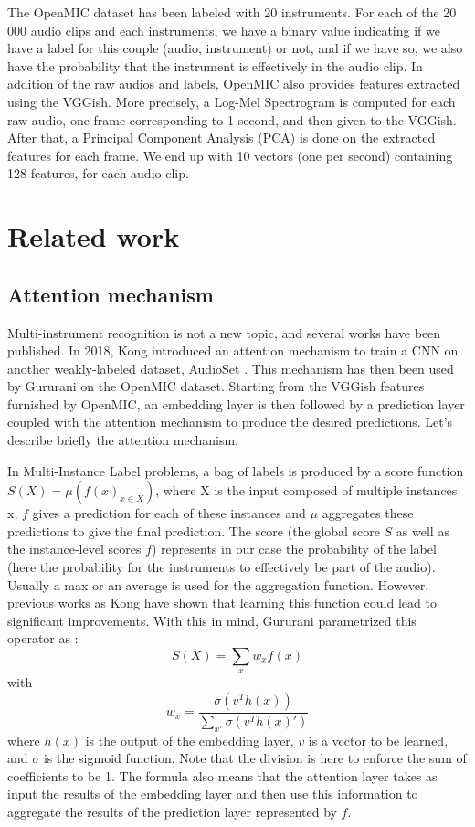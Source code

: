 \documentclass[final]{cvpr}
\begin{document}
The OpenMIC dataset has been labeled with 20 instruments. For each of the 20 000 audio clips and each instruments, we have a binary value indicating if we have a label for this couple (audio, instrument) or not, and if we have so, we also have the probability that the instrument is effectively in the audio clip. In addition of the raw audios and labels, OpenMIC also provides features extracted using the VGGish. More precisely, a Log-Mel Spectrogram is computed for each raw audio, one frame corresponding to 1 second, and then given to the VGGish. After that, a Principal Component Analysis (PCA) is done on the extracted features for each frame. We end up with 10 vectors (one per second) containing 128 features, for each audio clip.
\section{Related work}
\subsection{Attention mechanism}
Multi-instrument recognition is not a new topic, and several works have been published. In 2018, Kong \etal \cite{kong} introduced an attention mechanism to train a CNN on another weakly-labeled dataset, AudioSet \cite{audioset}. This mechanism has then been used by Gururani \etal \cite{attention} on the OpenMIC dataset. Starting from the VGGish features furnished by OpenMIC, an embedding layer is then followed by a prediction layer coupled with the attention mechanism to produce the desired predictions. Let's describe briefly the attention mechanism. 

In Multi-Instance Label problems, a bag of labels is produced by a score function $S(X)=\mu(f(x)_{x\in X})$, where X is the input composed of multiple instances x, $f$ gives a prediction for each of these instances and $\mu$ aggregates these predictions to give the final prediction. The score (the global score $S$ as well as the instance-level scores $f$) represents in our case the probability of the label (here the probability for the instruments to effectively be part of the audio). Usually a max or an average is used for the aggregation function. However, previous works as Kong \etal \cite{kong} have shown that learning this function could lead to significant improvements. With this in mind, Gururani \etal parametrized this operator as :
\[S(X)=\sum_{x}w_xf(x)\]
with 
\[w_x =\frac{\sigma(v^{T}h(x))}{\sum_{x'}\sigma(v^{T}h(x)')}\]
where $h(x)$ is the output of the embedding layer, $v$ is a vector to be learned, and $\sigma$ is the sigmoid function. Note that the division is here to enforce the sum of coefficients to be 1. The formula also means that the attention layer takes as input the results of the embedding layer and then use this information to aggregate the results of the prediction layer represented by $f$.
\end{document}

